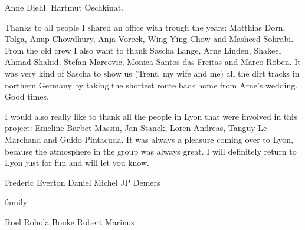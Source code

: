 Anne Diehl. Hartmut Oschkinat.

Thanks to all people I shared an office with trough the years: Matthias Dorn, Tolga, Anup Chowdhury, Anja Voreck, Wing Ying Chow and Masheed Sohrabi. From the old crew I also want to thank Sascha Lange, Arne Linden, Shakeel Ahmad Shahid, Stefan Marcovic, Monica Santos das Freitas and Marco Röben. It was very kind of Sascha to show us (Trent, my wife and me) all the dirt tracks in northern Germany by taking the shortest route back home from Arne's wedding. Good times.

I would also really like to thank all the people in Lyon that were involved in this project: Emeline Barbet-Massin, Jan Stanek, Loren Andreas, Tanguy Le Marchand and Guido Pintacuda. It was always a pleasure coming over to Lyon, because the atmosphere in the group was always great. I will definitely return to Lyon just for fun and will let you know.


Frederic
Everton
Daniel
Michel
JP Demers

family

Roel
Rohola
Bouke
Robert
Marinus
